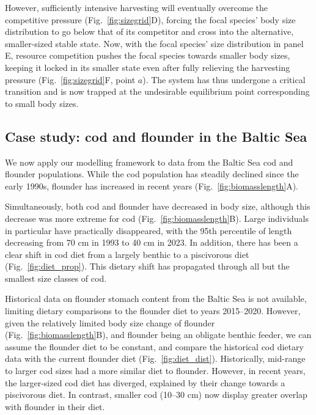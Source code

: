 \documentclass[12pt]{article}
\begin{document}
However, sufficiently intensive harvesting will eventually overcome the competitive pressure (Fig.~\ref{fig:sizegrid}D), forcing the focal species' body size distribution to go below that of its competitor and cross into the alternative, smaller-sized stable state. Now, with the focal species' size distribution in panel E, resource competition pushes the focal species towards smaller body sizes, keeping it locked in its smaller state even after fully relieving the harvesting pressure (Fig.~\ref{fig:sizegrid}F, point $a$). The system has thus undergone a critical transition and is now trapped at the undesirable equilibrium point corresponding to small body sizes.

\subsection*{Case study: cod and flounder in the Baltic Sea}

We now apply our modelling framework to data from the Baltic Sea cod and flounder populations. While the cod population has steadily declined since the early 1990s, flounder has increased in recent years (Fig.~\ref{fig:biomasslength}A).


Simultaneously, both cod and flounder have decreased in body size, although this decrease was more extreme for cod (Fig.~\ref{fig:biomasslength}B). Large individuals in particular have practically disappeared, with the 95th percentile of length decreasing from 70 cm in 1993 to 40 cm in 2023. In addition, there has been a clear shift in cod diet from a largely benthic to a piscivorous diet (Fig.~\ref{fig:diet_prop}). This dietary shift has propagated through all but the smallest size classes of cod.


Historical data on flounder stomach content from the Baltic Sea is not available, limiting dietary comparisons to the flounder diet to years 2015--2020. However, given the relatively limited body size change of flounder (Fig.~\ref{fig:biomasslength}B), and flounder being an obligate benthic feeder, we can assume the flounder diet to be constant, and compare the historical cod dietary data with the current flounder diet (Fig.~\ref{fig:diet_dist}). Historically, mid-range to larger cod sizes had a more similar diet to flounder. However, in recent years, the larger-sized cod diet has diverged, explained by their change towards a piscivorous diet. In contrast, smaller cod (10–30 cm) now display greater overlap with flounder in their diet.
\end{document}
